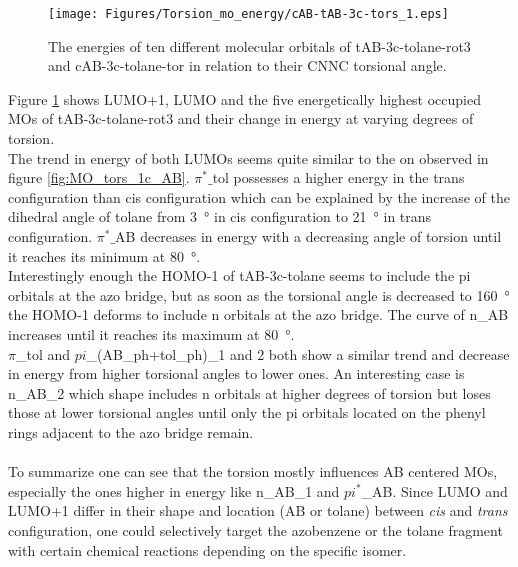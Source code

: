 %
%
%
%
%
\begin{figure}[H]
    \centering
    \texttt{[image: Figures/Torsion\_mo\_energy/cAB-tAB-3c-tors\_1.eps]}
    \caption{The energies of ten different molecular orbitals of tAB-3c-tolane-rot3 and cAB-3c-tolane-tor in relation to their CNNC torsional angle.}
    \label{fig:tAB-cAB-3c-tors_1}
\end{figure}
%
Figure \ref{fig:tAB-cAB-3c-tors_1} shows LUMO+1, LUMO and the five energetically highest occupied MOs of tAB-3c-tolane-rot3 and their change in energy at varying degrees of torsion. \\
The trend in energy of both LUMOs seems quite similar to the on observed in figure \ref{fig:MO_tors_1c_AB}. $\pi^*\_$tol possesses a higher energy in the trans configuration than cis configuration which can be explained by the increase of the dihedral angle of tolane from \SI{3}{\degree} in cis configuration to \SI{21}{\degree} in trans configuration. $\pi^*\_$AB decreases in energy with a decreasing angle of torsion until it reaches its minimum at \SI{80}{\degree}. \\
Interestingly enough the HOMO-1 of tAB-3c-tolane seems to include the pi orbitals at the azo bridge, but as soon as the torsional angle is decreased to \SI{160}{\degree} the HOMO-1 deforms to include n orbitals at the azo bridge. The curve of n\_AB increases until it reaches its maximum at \SI{80}{\degree}. \\
$\pi$\_tol and $pi$\_(AB\_ph+tol\_ph)\_1 and 2 both show a similar trend and decrease in energy from higher torsional angles to lower ones. An interesting case is n\_AB\_2 which shape includes n orbitals at higher degrees of torsion but loses those at lower torsional angles until only the pi orbitals located on the phenyl rings adjacent to the azo bridge remain. \\
\\
To summarize one can see that the torsion mostly influences AB centered MOs, especially the ones higher in energy like n\_AB\_1 and $pi^*$\_AB. Since LUMO and LUMO+1 differ in their shape and location (AB or tolane) between \textit{cis} and \textit{trans} configuration, one could selectively target the azobenzene or the tolane fragment with certain chemical reactions depending on the specific isomer. 
%
%
%
